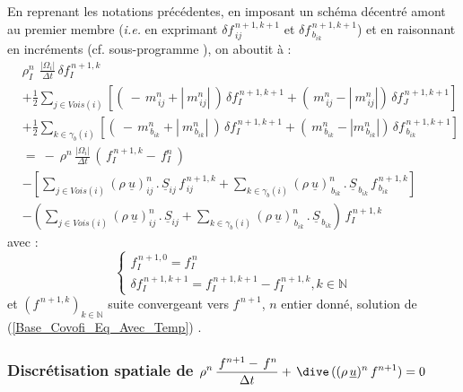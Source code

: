 En reprenant les notations pr\'ec\'edentes, en imposant un sch\'ema d\'ecentr\'e
amont au premier membre ({\it i.e.} en exprimant $\delta f_{\,ij}^{\,n+1,k+1}$ et
$\delta f_{\,{b}_{ik}}^{\,n+1,k+1}$) et en raisonnant en incr\'ements
(cf. sous-programme ), on aboutit \`a :
\begin{equation}
\begin{array}{lll}
&\rho_I^n\,\displaystyle\ \frac{|\Omega_i|}{\Delta
t}\,\delta f_I^{\,n+1,k}\\
& +\displaystyle\frac{1}{2}\sum\limits_{j\in Vois(i)}\left[(\
-\,m_{\,ij}^n + |\ m_{\,ij}^n|\ )\,\delta f_I^{\,n+1,k+1}+ (\ m_{\,ij}^n - |\ m_{\,ij}^n|)\,\delta f_J^{\,n+1,k+1}\right]\\
&+\displaystyle\frac{1}{2}\sum\limits_{k\in {\gamma_b(i)}}\left[(\ -\,
m_{\,{b}_{ik}}^n + |\ m_{\,{b}_{ik}}^n|\ )\,\delta f_I^{\,n+1,k+1} + (\
m_{\,{b}_{ik}}^n - |m_{\,{b}_{ik}}^n|)\,\delta
f_{\,{b}_{ik}}^{\,n+1,k+1}\right]\\
& =\ -\ \displaystyle \rho^n \,\frac {|\Omega_i| }{\Delta t}\,(\,f_I^{\,n+1,k}
-\,f_I^n\,)\\
& - \left[\sum\limits_{j\in Vois(i)} (\rho\ \underline{u})^{n}_{ij}\,.\,\underline{S}_{ij}\, f^{\,n+1,k}_{\,ij}+\sum\limits_{k\in {\gamma_b(i)}} (\rho\
\underline{u})^{n}_{\,b_{ik}}\,.\,\underline{S}_{\,b_{ik}}\,f^{\,n+1,k}_{\,{b_{ik}}}\right]\\
&-\left(\sum\limits_{j\in Vois(i)} (\rho\ \underline{u})^{n}_{ij}\,.\,\underline{S}_{ij}+\sum\limits_{k\in {\gamma_b(i)}} (\rho\
\underline{u})^{n}_{\,b_{ik}}\,.\,\underline{S}_{\,b_{ik}}\right)\,f_I^{\,n+1,k}
\end{array}
\end{equation}
avec :
\begin{equation}
\left\{\begin{array}{ll}
f_I^{\,n+1,0} = f_I^{\,n}\\
\delta f_I^{\,n+1,k+1} = f_I^{\,n+1,k+1} - f_I^{\,n+1,k},{\text {$k\in \mathbb{N}$}}
\end{array}\right.
\end{equation}
et $(f^{\,n+1,k})_{k\in \mathbb{N}}$ suite convergeant vers  $f^{\,n+1}$, $n$
entier donn\'e, solution de (\ref{Base_Covofi_Eq_Avec_Temp}) .\\

 \newpage
\subsubsection* {Discr\'etisation spatiale de
 $ \displaystyle \rho^n \,\frac {\,f^{n+1} -\,f^n}{\Delta t} +\,\dive\,((\rho\,\underline{u})^n\,f^{n+1}) = 0$}

